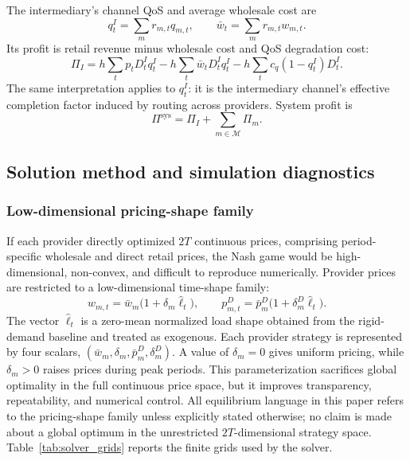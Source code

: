 \documentclass[11pt,a4paper]{article}
\newcommand{\M}{\mathcal{M}}
\newcommand{\D}{D}
\begin{document}
The intermediary's channel QoS and average wholesale cost are
\begin{equation}
  q^I_t=\sum_m r_{m,t}q_{m,t},
  \qquad
  \bar w_t=\sum_m r_{m,t}w_{m,t}.
  \label{eq:intermediary_channel}
\end{equation}
Its profit is retail revenue minus wholesale cost and QoS degradation cost:
\begin{equation}
  \Pi_I
  =h\sum_t p_t\D^I_t q^I_t
  -h\sum_t \bar w_t\D^I_t q^I_t
  -h\sum_t c_q(1-q^I_t)\D^I_t .
  \label{eq:intermediary_profit}
\end{equation}
The same interpretation applies to $q^I_t$: it is the intermediary channel's effective completion factor induced by routing across providers. System profit is
\begin{equation}
  \Pi^{\mathrm{sys}}=\Pi_I+\sum_{m\in\M}\Pi_m .
  \label{eq:system_profit}
\end{equation}

\subsection{Solution method and simulation diagnostics}
\label{sec:solver}

\subsubsection{Low-dimensional pricing-shape family}

If each provider directly optimized $2T$ continuous prices, comprising period-specific wholesale and direct retail prices, the Nash game would be high-dimensional, non-convex, and difficult to reproduce numerically. Provider prices are restricted to a low-dimensional time-shape family:
\begin{equation}
  w_{m,t}=\bar w_m\big(1+\delta_m\widehat{\ell}_t\big),
  \qquad
  p^D_{m,t}=\bar p^D_m\big(1+\delta^D_m\widehat{\ell}_t\big).
  \label{eq:shape}
\end{equation}
The vector $\widehat{\ell}_t$ is a zero-mean normalized load shape obtained from the rigid-demand baseline and treated as exogenous. Each provider strategy is represented by four scalars, $(\bar w_m,\delta_m,\bar p^D_m,\delta^D_m)$. A value of $\delta_m=0$ gives uniform pricing, while $\delta_m>0$ raises prices during peak periods. This parameterization sacrifices global optimality in the full continuous price space, but it improves transparency, repeatability, and numerical control. All equilibrium language in this paper refers to the pricing-shape family unless explicitly stated otherwise; no claim is made about a global optimum in the unrestricted $2T$-dimensional strategy space. Table~\ref{tab:solver_grids} reports the finite grids used by the solver.
\end{document}
